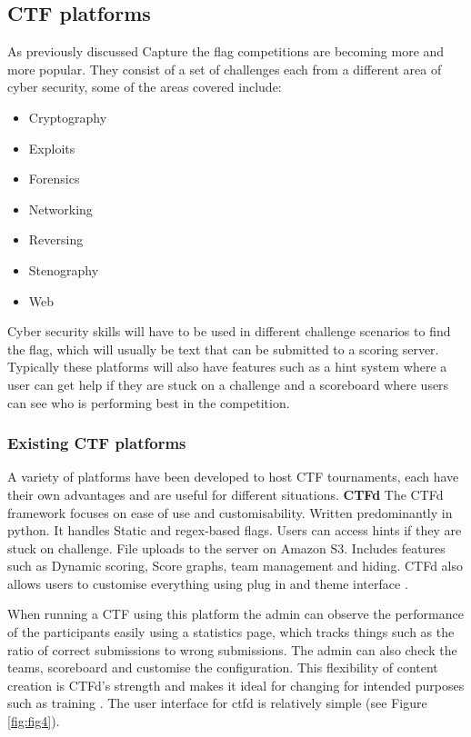 \documentclass[12pt,a4paper]{article}
\begin{document}
\subsection{CTF platforms}
As previously discussed Capture the flag competitions are becoming more and more popular. They consist of a set of challenges each from a different area of cyber security, some of the areas covered include: 
\begin{itemize}
  \item Cryptography
  \item Exploits 
  \item Forensics 
  \item Networking 
  \item Reversing 
  \item Stenography  
  \item Web
\end{itemize}
Cyber security skills will have to be used in different challenge scenarios to find the flag, which will usually be text that can be submitted to a scoring server\cite{burket2015automatic}. Typically these platforms will also have features such as a hint system where a user can get help if they are stuck on a challenge and a scoreboard where users can see who is performing best in the competition.   

\subsubsection{Existing CTF platforms}  
A variety of platforms have been developed to host CTF tournaments, each have their own advantages and are useful for different situations.  
\textbf{CTFd} 
The CTFd framework focuses on ease of use and customisability.  Written predominantly in python. It handles Static and regex-based flags. Users can access hints if they are stuck on challenge. File uploads to the server on Amazon S3. Includes features such as Dynamic scoring, Score graphs, team management and hiding. CTFd also allows users to customise everything using plug in and theme interface \cite{ctfd}.   

When running a CTF using this platform the admin can observe the performance of the participants easily using a statistics page, which tracks things such as the ratio of correct submissions to wrong submissions. The admin can also check the teams, scoreboard and customise the configuration. This flexibility of content creation is CTFd's strength and makes it ideal for changing for intended purposes such as training \cite{noor2018usability}. The user interface for ctfd is relatively simple (see Figure \ref{fig:fig4}).
\end{document}

